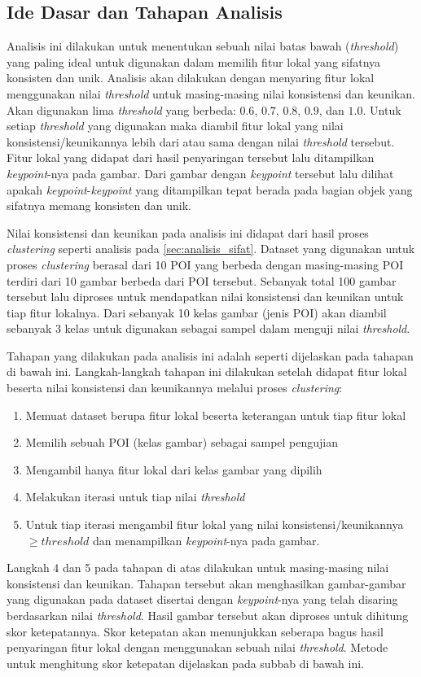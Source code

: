 \subsection{Ide Dasar dan Tahapan Analisis}
\label{subsec:ide_tahapan_analisis_threshold}
Analisis ini dilakukan untuk menentukan sebuah nilai batas bawah (\textit{threshold}) yang paling ideal untuk digunakan dalam memilih fitur lokal yang sifatnya konsisten dan unik. Analisis akan dilakukan dengan menyaring fitur lokal menggunakan nilai \textit{threshold} untuk masing-masing nilai konsistensi dan keunikan. Akan digunakan lima \textit{threshold} yang berbeda: $0.6$, $0.7$, $0.8$, $0.9$, dan $1.0$. Untuk setiap \textit{threshold} yang digunakan maka diambil fitur lokal yang nilai konsistensi/keunikannya lebih dari atau sama dengan nilai \textit{threshold} tersebut. Fitur lokal yang didapat dari hasil penyaringan tersebut lalu ditampilkan \textit{keypoint}-nya pada gambar. Dari gambar dengan \textit{keypoint} tersebut lalu dilihat apakah \textit{keypoint}-\textit{keypoint} yang ditampilkan tepat berada pada bagian objek yang sifatnya memang konsisten dan unik.

Nilai konsistensi dan keunikan pada analisis ini didapat dari hasil proses \textit{clustering} seperti analisis pada \ref{sec:analisis_sifat}. Dataset yang digunakan untuk proses \textit{clustering} berasal dari 10 POI yang berbeda dengan masing-masing POI terdiri dari 10 gambar berbeda dari POI tersebut. Sebanyak total 100 gambar tersebut lalu diproses untuk mendapatkan nilai konsistensi dan keunikan untuk tiap fitur lokalnya. Dari sebanyak 10 kelas gambar (jenis POI) akan diambil sebanyak 3 kelas untuk digunakan sebagai sampel dalam menguji nilai \textit{threshold}.

Tahapan yang dilakukan pada analisis ini adalah seperti dijelaskan pada tahapan di bawah ini. Langkah-langkah tahapan ini dilakukan setelah didapat fitur lokal beserta nilai konsistensi dan keunikannya melalui proses \textit{clustering}:
\begin{enumerate}
	\item Memuat dataset berupa fitur lokal beserta keterangan untuk tiap fitur lokal
	\item Memilih sebuah POI (kelas gambar) sebagai sampel pengujian 
	\item Mengambil hanya fitur lokal dari kelas gambar yang dipilih
	\item Melakukan iterasi untuk tiap nilai \textit{threshold}
	\item Untuk tiap iterasi mengambil fitur lokal yang nilai konsistensi/keunikannya $\geq {threshold}$ dan menampilkan \textit{keypoint}-nya pada gambar.
\end{enumerate}
Langkah 4 dan 5 pada tahapan di atas dilakukan untuk masing-masing nilai konsistensi dan keunikan. Tahapan tersebut akan menghasilkan gambar-gambar yang digunakan pada dataset disertai dengan \textit{keypoint}-nya yang telah disaring berdasarkan nilai \textit{threshold}. Hasil gambar tersebut akan diproses untuk dihitung skor ketepatannya. Skor ketepatan akan menunjukkan seberapa bagus hasil penyaringan fitur lokal dengan menggunakan sebuah nilai \textit{threshold}. Metode untuk menghitung skor ketepatan dijelaskan pada subbab di bawah ini.

